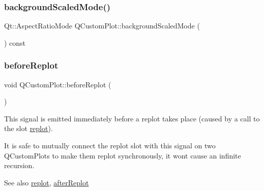 \mbox{\label{class_q_custom_plot_af8f1ebfdbf48d7c49f95136475d55b14}} 
\subsubsection{\texorpdfstring{backgroundScaledMode()}{backgroundScaledMode()}}
{\footnotesize\ttfamily Qt\+::\+Aspect\+Ratio\+Mode Q\+Custom\+Plot\+::background\+Scaled\+Mode (\begin{DoxyParamCaption}{ }\end{DoxyParamCaption}) const\hspace{0.3cm}{\ttfamily [inline]}}

\mbox{\label{class_q_custom_plot_a0cd30e29b73efd6afe096e44bc5956f5}} 
\subsubsection{\texorpdfstring{beforeReplot}{beforeReplot}}
{\footnotesize\ttfamily void Q\+Custom\+Plot\+::before\+Replot (\begin{DoxyParamCaption}{ }\end{DoxyParamCaption})\hspace{0.3cm}{\ttfamily [signal]}}

This signal is emitted immediately before a replot takes place (caused by a call to the slot \mbox{\hyperlink{class_q_custom_plot_aa4bfe7d70dbe67e81d877819b75ab9af}{replot}}).

It is safe to mutually connect the replot slot with this signal on two Q\+Custom\+Plots to make them replot synchronously, it won\textquotesingle{}t cause an infinite recursion.

\begin{DoxySeeAlso}{See also}
\mbox{\hyperlink{class_q_custom_plot_aa4bfe7d70dbe67e81d877819b75ab9af}{replot}}, \mbox{\hyperlink{class_q_custom_plot_a6f4fa624af060bc5919c5f266cf426a0}{after\+Replot}} 
\end{DoxySeeAlso}
\mbox{\label{class_q_custom_plot_a53d35abe0f576f9838cde5d0bee47657}} 

